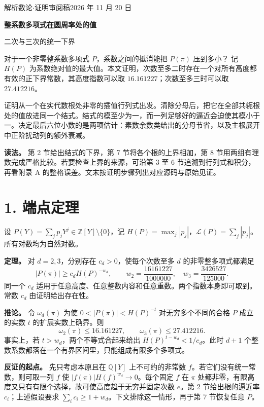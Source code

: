 \documentclass[11pt,a4paper]{article}
\begin{document}
\thispagestyle{plain}
{\small\sffamily\color{muted}解析数论\quad$\cdot$\quad 证明审阅稿\hfill 2026 年 11 月 20 日\par}
\vspace{4mm}
{\fontsize{24}{31}\selectfont\sffamily\bfseries\color{heading}整系数多项式在圆周率处的值\par}
{\Large 二次与三次的统一下界\par}
\medskip
对于一个非零整系数多项式 \(P\)，系数之间的抵消能把 \(P(\pi)\) 压到多小？
记 \(H(P)\) 为系数绝对值的最大值。本文证明，次数至多二时存在一个对所有高度都有效的正下界常数，其高度指数可以取 \(16.161227\)；次数至多三时可以取 \(27.412216\)。

证明从一个在实代数根处非零的插值行列式出发。清除分母后，把它在全部共轭根处的值放进同一个结式。结式的模至少为一，而一列足够好的逼近会迫使其模小于一。决定最后六位小数的是两项估计：素数余数类给出的分母节省，以及主根展开中正阶扰动列的额外衰减。

\textbf{读法。} 第 2 节给出结式的下界，第 7 节将各个根的上界相加，第 8 节用两组有理数完成严格比较。若要检查上界的来源，可沿第 3 至 6 节追溯到行列式和积分，再看附录 A 的整格误差。文末按证明步骤列出对应源码与原始见证。

\medskip\tableofcontents
\clearpage
{}
\section{1. 端点定理}
设 \(P(Y)=\sum_j p_jY^j\in\mathbb Z[Y]\setminus\{0\}\)，记 \(H(P)=\max_j|p_j|\)，\(\mathcal L(P)=\sum_j|p_j|\)。所有对数均为自然对数。

\textbf{定理。} 对 \(d=2,3\)，分别存在 \(c_d>0\)，使每个次数至多 \(d\) 的非零整多项式都满足
\[
 |P(\pi)|\ge c_dH(P)^{-w_d},\qquad
 w_2=\frac{16161227}{1000000},\quad w_3=\frac{3426527}{125000}. \tag{1}\label{eq:1}
\]
同一个 \(c_d\) 适用于任意高度、任意整数内容和任意重数。两个指数本身即可取到。常数 \(c_d\) 由证明给出存在性。

\textbf{推论。} 令 \(\omega_d(\pi)\) 为使 \(0<|P(\pi)|<H(P)^{-t}\) 对无穷多个不同的合格 \(P\) 成立的实数 \(t\) 的扩展实数上确界。则
\[
 \omega_2(\pi)\le16.161227,\qquad \omega_3(\pi)\le27.412216. \tag{2}\label{eq:2}
\]
事实上，若 \(t>w_d\)，两个不等式合起来给出 \(H(P)^{t-w_d}<1/c_d\)。此时 \(d+1\) 个整数系数都落在一个有界区间里，只能组成有限多个多项式。

\textbf{反证的起点。} 先只考虑本原且在 \(\mathbb Q[Y]\) 上不可约的非常数 \(f\)。若它们没有统一常数，则可取一列 \(f\) 使 \(|f(\pi)|H(f)^{w_d}\to0\)。每个固定 \(f\) 在 \(\pi\) 处都非零，有限高度又只有有限个选择，故可使高度趋于无穷并固定次数 \(e\)。第 2 节给出根的逼近率 \(c_i\)；上述假设要求 \(\sum_i c_i\ge 1+w_d\)。下文排除这一情形，再于第 7 节恢复任意 \(P\)。
\end{document}
